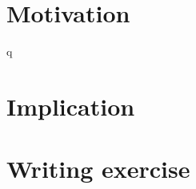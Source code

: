 \documentclass{article}
\begin{document}
\section{Motivation}
q
\section{Implication}

\section{Writing exercise}
\end{document}
